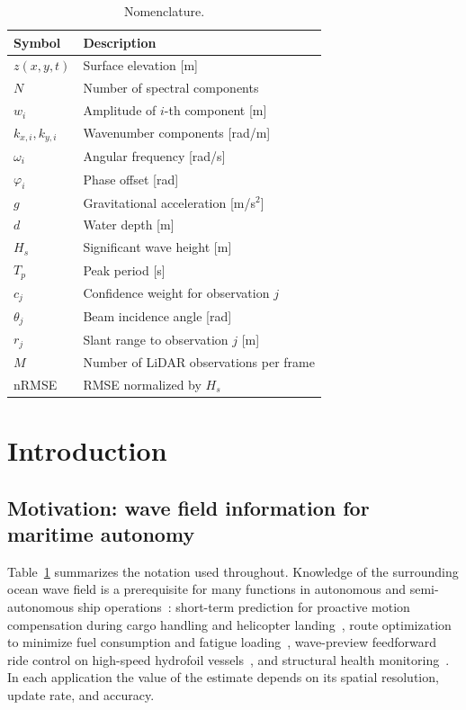 \documentclass[review]{elsarticle}
\begin{document}
\linenumbers

\begin{table}[h]
\centering
\caption{Nomenclature.}
\label{tab:nomenclature}
\begin{tabular}{ll}
\toprule
Symbol & Description \\
\midrule
$z(x,y,t)$ & Surface elevation [m] \\
$N$ & Number of spectral components \\
$w_i$ & Amplitude of $i$-th component [m] \\
$k_{x,i}, k_{y,i}$ & Wavenumber components [rad/m] \\
$\omega_i$ & Angular frequency [rad/s] \\
$\varphi_i$ & Phase offset [rad] \\
$g$ & Gravitational acceleration [m/s$^2$] \\
$d$ & Water depth [m] \\
$H_s$ & Significant wave height [m] \\
$T_p$ & Peak period [s] \\
$c_j$ & Confidence weight for observation $j$ \\
$\theta_j$ & Beam incidence angle [rad] \\
$r_j$ & Slant range to observation $j$ [m] \\
$M$ & Number of LiDAR observations per frame \\
nRMSE & RMSE normalized by $H_s$ \\
\bottomrule
\end{tabular}
\end{table}

\section{Introduction}
\label{sec:intro}

\subsection{Motivation: wave field information for maritime autonomy}

Table~\ref{tab:nomenclature} summarizes the notation used throughout.
Knowledge of the surrounding ocean wave field is a prerequisite for
many functions in autonomous and semi-autonomous ship
operations~\citep{faltinsen2005, holthuijsen2007}: short-term
prediction for proactive motion compensation during cargo handling
and helicopter landing~\citep{desmars2023jfm}, route optimization to
minimize fuel consumption and fatigue loading~\citep{vettor2016},
wave-preview feedforward ride control on high-speed hydrofoil
vessels~\citep{park2026hydrofoil}, and structural health
monitoring~\citep{DNV2010}.  In each application the value of the
estimate depends on its spatial resolution, update rate, and
accuracy.
\end{document}
